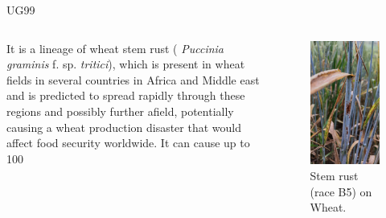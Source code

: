 \documentclass[10pt,dvipsnames,ignorenonframetext,aspectratio=169]{beamer}
\begin{document}
\begin{frame}{UG99}
\protect\hypertarget{ug99}{}
\begin{columns}[T, onlytextwidth]

It is a lineage of wheat stem rust ( \textit{Puccinia graminis} f. sp. \textit{tritici}), which is present in wheat fields in several countries in Africa and Middle east and is predicted to spread rapidly through these regions and possibly further afield, potentially causing a wheat production disaster that would affect food security worldwide. It can cause up to 100%


\begin{figure}
\includegraphics[width=0.6\linewidth]{../images/B5_StemRust} \caption{Stem rust (race B5) on Wheat.}\label{fig:stem-rust}
\end{figure}

\end{columns}
\end{frame}
\end{document}
